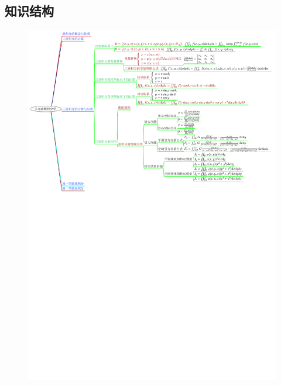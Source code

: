 \documentclass[12pt,UTF8]{ctexart}
\begin{document}
\subsection{知识结构}
\begin{figure}[H]
\begin{center}
\includegraphics[height=0.9\textheight,angle=0]{20190611-2.pdf}
\end{center}
\end{figure}
\end{document}
